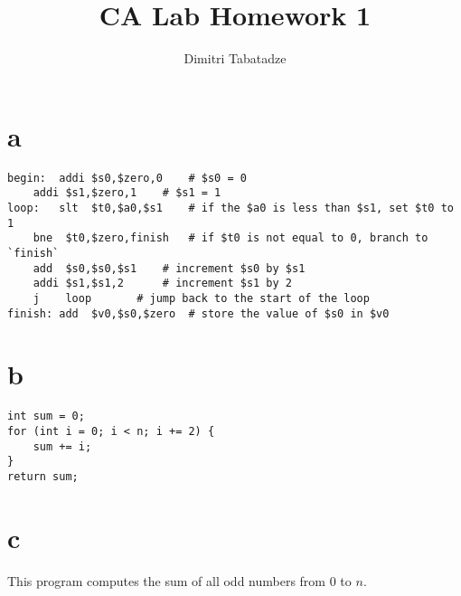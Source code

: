 \documentclass{article}
\title{CA Lab Homework 1}
\author{Dimitri Tabatadze}
\begin{document}
    \maketitle


    \section*{a}

    \scriptsize
    \begin{lstlisting}
begin:  addi $s0,$zero,0	# $s0 = 0
	addi $s1,$zero,1	# $s1 = 1
loop:   slt  $t0,$a0,$s1	# if the $a0 is less than $s1, set $t0 to 1
	bne  $t0,$zero,finish	# if $t0 is not equal to 0, branch to `finish`
	add  $s0,$s0,$s1	# increment $s0 by $s1
	addi $s1,$s1,2		# increment $s1 by 2
	j    loop		# jump back to the start of the loop
finish: add  $v0,$s0,$zero	# store the value of $s0 in $v0
    \end{lstlisting}

    \section*{b}
    \begin{lstlisting}
int sum = 0;
for (int i = 0; i < n; i += 2) {
    sum += i;
}
return sum;
    \end{lstlisting}

    \section*{c}
    This program computes the sum of all odd numbers from \(0\) to \(n\).
\end{document}
